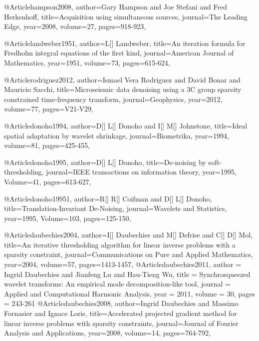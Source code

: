 @Article{hampson2008,
  author={Gary Hampson and Joe Stefani and Fred Herkenhoff},
  title={Acquisition using simultaneous sources},
  journal={The Leading Edge},
  year=2008,
  volume=27,
  pages={918-923},
}

@Article{landweber1951,
  author={L[] Landweber},
  title={An iteration formula for Fredholm integral equations of the first kind},
  journal={American Journal of Mathematics},
  year=1951,
  volume=73,
  pages={615-624},
}

@Article{rodriguez2012,
  author={Ismael Vera Rodriguez and David Bonar and Mauricio Sacchi},
  title={Microseismic data denoising using a 3C group sparsity constrained time-frequency transform},
  journal={Geophysics},
  year=2012,
  volume=77,
  pages={V21-V29},
}

@Article{donoho1994,
  author={D[] L[] Donoho and I[] M[] Johnstone},
  title={Ideal spatial adaptation by wavelet shrinkage},
  journal={Biometrika},
  year=1994,
  volume=81,
  pages={425-455},
}

@Article{donoho1995,
  author={D[] L[] Donoho},
  title={De-noising by soft-thresholding},
  journal={IEEE transactions on information theory},
  year=1995,
  Volume=41,
  pages={613-627},
}

@Article{donoho19951,
  author={R[] R[] Coifman and D[] L[] Donoho},
  title={Translation-Invariant De-Noising},
  journal={Wavelets and Statistics},
  year=1995,
  Volume=103,
  pages={125-150},
}

@Article{daubechies2004,
  author={I[] Daubechies and M[] Defrise and C[] D[] Mol},
  title={An iterative thresholding algorithm for linear inverse problems with a sparsity constraint},
  journal={Communications on Pure and Applied Mathematics},
  year=2004,
  volume=57,
  pages={1413-1457},
}
@Article{daubechies2011,
  author = 	 {Ingrid Daubechies and Jianfeng Lu and Hau-Tieng Wu},
  title = 	 {Synchrosqueezed wavelet transforms: An empirical mode decomposition-like tool},
  journal = 	 {Applied and Computational Harmonic Analysis},
  year = 	 2011,
  volume = 	 30,
  pages = 	 {243-261}
}
@Article{daubechies2008,
  author={Ingrid Daubechies and Massimo Fornasier and Ignace Loris},
  title={Accelerated projected gradient method for linear inverse problems with sparsity constraints},
  journal={Journal of Fourier Analysis and Applications},
  year=2008,
  volume=14,
  pages={764-792},
}

